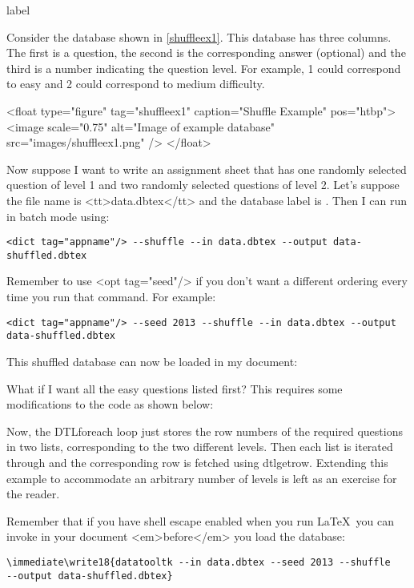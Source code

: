 \begin{example}{label}{}

   Consider the database shown in \autoref{shuffleex1}. This database
   has three columns. The first is a question, the second is the 
   corresponding answer (optional) and the third is a number indicating 
   the question level.  For example, 1 could correspond to easy and 2 could 
   correspond to medium difficulty.

   <float type="figure" tag="shuffleex1" caption="Shuffle Example" pos="htbp">
      <image scale="0.75" alt="Image of example database" src="images/shuffleex1.png" />
   </float>

   Now suppose I want to write an assignment sheet that has one randomly
   selected question of level 1 and two randomly selected questions of
   level 2. Let's suppose the file name is <tt>data.dbtex</tt>
   and the database label is . Then I can run 
   in batch mode using:
\begin{verbatim}
<dict tag="appname"/> --shuffle --in data.dbtex --output data-shuffled.dbtex
\end{verbatim}
   Remember to use <opt tag="seed"/> if you don't want a different
   ordering every time you run that command. For example:
\begin{verbatim}
<dict tag="appname"/> --seed 2013 --shuffle --in data.dbtex --output data-shuffled.dbtex
\end{verbatim}
   This shuffled database can now be loaded in my document:



   What if I want all the easy questions listed first? This requires 
   some modifications to the code as shown below:



   Now, the \gls{DTLforeach} loop just stores the row numbers of the
   required questions in two lists, corresponding to the two different levels.
   Then each list is iterated through and the corresponding row is fetched
   using \gls{dtlgetrow}. Extending this example to accommodate an
   arbitrary number of levels is left as an exercise for the reader.


   Remember that if you have shell escape enabled when you run \LaTeX\ you
   can invoke  in your document <em>before</em> you load the database:

\begin{verbatim}
\immediate\write18{datatooltk --in data.dbtex --seed 2013 --shuffle 
--output data-shuffled.dbtex}


\end{verbatim}
\end{example}

